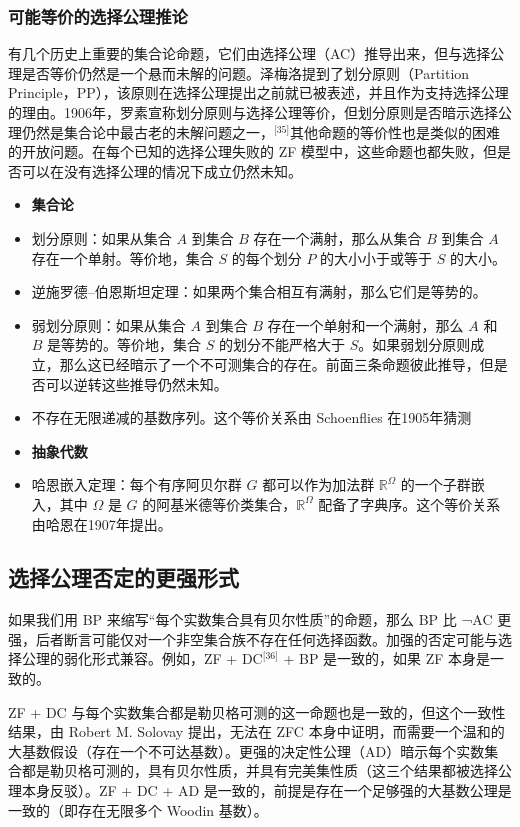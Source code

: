 \subsubsection{可能等价的选择公理推论}  
有几个历史上重要的集合论命题，它们由选择公理（AC）推导出来，但与选择公理是否等价仍然是一个悬而未解的问题。泽梅洛提到了划分原则（Partition Principle，PP），该原则在选择公理提出之前就已被表述，并且作为支持选择公理的理由。1906年，罗素宣称划分原则与选择公理等价，但划分原则是否暗示选择公理仍然是集合论中最古老的未解问题之一，\(^\text{[35]}\)其他命题的等价性也是类似的困难的开放问题。在每个已知的选择公理失败的 ZF 模型中，这些命题也都失败，但是否可以在没有选择公理的情况下成立仍然未知。
\begin{itemize}
\item \textbf{集合论}  
\item 划分原则：如果从集合 \(A\) 到集合 \(B\) 存在一个满射，那么从集合 \(B\) 到集合 \(A\) 存在一个单射。等价地，集合 \(S\) 的每个划分 \(P\) 的大小小于或等于 \(S\) 的大小。  
\item 逆施罗德–伯恩斯坦定理：如果两个集合相互有满射，那么它们是等势的。  
\item 弱划分原则：如果从集合 \(A\) 到集合 \(B\) 存在一个单射和一个满射，那么 \(A\) 和 \(B\) 是等势的。等价地，集合 \(S\) 的划分不能严格大于 \(S\)。如果弱划分原则成立，那么这已经暗示了一个不可测集合的存在。前面三条命题彼此推导，但是否可以逆转这些推导仍然未知。  
\item 不存在无限递减的基数序列。这个等价关系由 Schoenflies 在1905年猜测
\end{itemize}
\begin{itemize}
\item \textbf{抽象代数}  
\item 哈恩嵌入定理：每个有序阿贝尔群 \(G\) 都可以作为加法群 \(\mathbb{R}^\Omega\) 的一个子群嵌入，其中 \(\Omega\) 是 \(G\) 的阿基米德等价类集合，\(\mathbb{R}^\Omega\) 配备了字典序。这个等价关系由哈恩在1907年提出。
\end{itemize}
\subsection{选择公理否定的更强形式}  
如果我们用 BP 来缩写“每个实数集合具有贝尔性质”的命题，那么 BP 比 ¬AC 更强，后者断言可能仅对一个非空集合族不存在任何选择函数。加强的否定可能与选择公理的弱化形式兼容。例如，ZF + DC\(^\text{[36]}\) + BP 是一致的，如果 ZF 本身是一致的。

ZF + DC 与每个实数集合都是勒贝格可测的这一命题也是一致的，但这个一致性结果，由 Robert M. Solovay 提出，无法在 ZFC 本身中证明，而需要一个温和的大基数假设（存在一个不可达基数）。更强的决定性公理（AD）暗示每个实数集合都是勒贝格可测的，具有贝尔性质，并具有完美集性质（这三个结果都被选择公理本身反驳）。ZF + DC + AD 是一致的，前提是存在一个足够强的大基数公理是一致的（即存在无限多个 Woodin 基数）。

